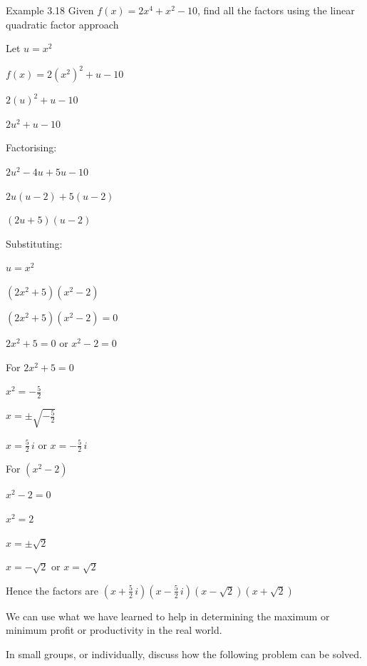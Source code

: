 \begin{example}{Example 3.18}
Given $f(x) = 2x^4 + x^2 - 10$, find all the factors using the linear quadratic factor
approach

\solution
Let $u = x^2$

$f(x) = 2(x^2)^2 + u - 10$

$2(u)^2 + u - 10$

$2u^2 + u - 10$

Factorising:

$2u^2 - 4u + 5u - 10$

$2u(u - 2) + 5(u - 2)$

$(2u + 5)(u - 2)$

Substituting:

$u = x^2$

$(2x^2 + 5)(x^2 - 2)$

$(2x^2 + 5)(x^2 - 2) = 0$

$2x^2 + 5 = 0$ or $x^2 - 2 = 0$

For $2x^2 + 5 = 0$

$x^2 = -\frac{5}{2}$

$x = \pm\sqrt{-\frac{5}{2}}$

$x = \frac{5}{2}\,i$ or $x = -\frac{5}{2}\,i$

For $(x^2 - 2)$

$x^2 - 2 = 0$

$x^2 = 2$

$x = \pm\sqrt{2}$

$x = -\sqrt{2}$ or $x = \sqrt{2}$

Hence the factors are $\left(x + \frac{5}{2}\,i\right)\left(x - \frac{5}{2}\,i\right)
\left(x - \sqrt{2}\right)\left(x + \sqrt{2}\right)$
\end{example}

We can use what we have learned to help in determining the maximum or minimum
profit or productivity in the real world.

In small groups, or individually, discuss how the following problem can be solved.

